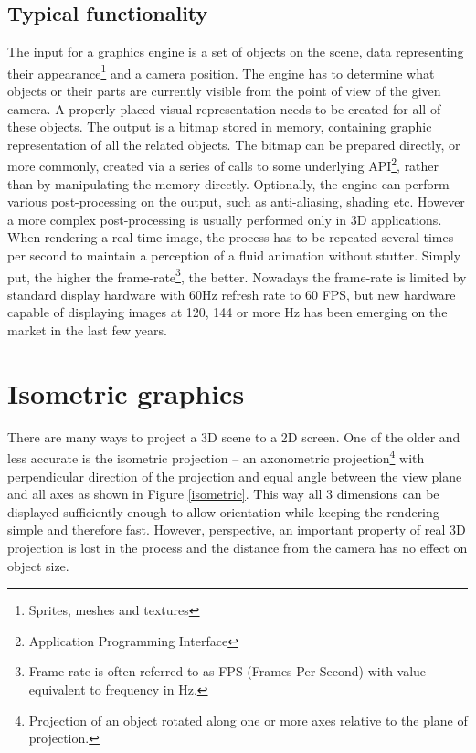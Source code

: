 \documentclass[11pt,oneside, final]{fithesis2}
\begin{document}
\subsection{Typical functionality}
\label{enginefunctionality}
The input for a graphics engine is a set of objects on the scene, data representing their appearance\footnote{Sprites, meshes and textures} and a camera position. The engine has to determine what objects or their parts are currently visible from the point of view of the given camera. A properly placed visual representation needs to be created for all of these objects. The output is a bitmap stored in memory, containing graphic representation of all the related objects. The bitmap can be prepared directly, or more commonly, created via a series of calls to some underlying API\footnote{Application Programming Interface}, rather than by manipulating the memory directly. Optionally, the engine can perform various post-processing on the output, such as anti-aliasing, shading etc.\cite{gregory} However a more complex post-processing is usually performed only in 3D applications. When rendering a real-time image, the process has to be repeated several times per second to maintain a perception of a fluid animation without stutter. Simply put, the higher the frame-rate\footnote{Frame rate is often referred to as FPS (Frames Per Second) with value equivalent to frequency in Hz.}, the better\cite{claypool}. Nowadays the frame-rate is limited by standard display hardware with 60Hz refresh rate to 60 FPS, but new hardware capable of displaying images at 120, 144 or more Hz has been emerging on the market in the last few years.

\section{Isometric graphics}
There are many ways to project a 3D scene to a 2D screen. One of the older and less accurate is the isometric projection -- an axonometric projection\footnote{Projection of an object rotated along one or more axes relative to the plane of projection\cite{maynard}.} with perpendicular direction of the projection and equal angle between the view plane and all axes\cite{desai} as shown in Figure \ref{isometric}. This way all 3 dimensions can be displayed sufficiently enough to allow orientation while keeping the rendering simple and therefore fast. However, perspective, an important property of real 3D projection is lost in the process and the distance from the camera has no effect on object size.
\end{document}
